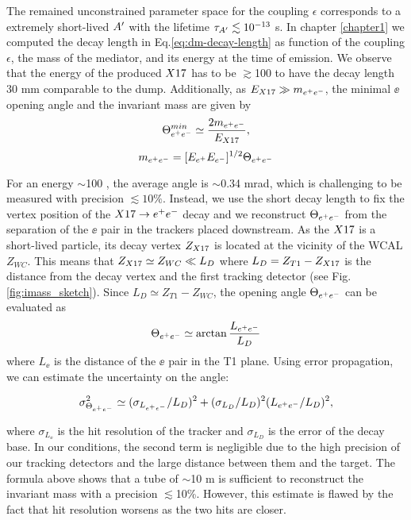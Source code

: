 The remained unconstrained parameter space for the coupling $\epsilon$  corresponds to a extremely short-lived $A'$ with the lifetime $\tau_{A'} \lesssim 10^{-13}$ s. In chapter \ref{chapter1} we computed the decay length in Eq.\ref{eq:dm-decay-length} as function of the coupling $\epsilon$, the mass of the mediator, and its energy at the time of emission.
We observe that the energy of the produced $X17$ has to be $\gtrsim$100 \gev to have the decay length 30 mm comparable to the dump.
Additionally, as $E_{X17} \gg m_{e^+e^-}$, the minimal $\ee$ opening angle and the invariant mass are given by
\begin{equation} 
\Theta_{ e^+e^-}^{min} \simeq  \frac{2m_{e^+e^-}}{E_{X17}},
\label{eqn:angle}
\end{equation}
\begin{equation}
m_{e^+e^-} = [E_{e^+} E_{e^-}]^{1/2} \Theta_{ e^+e^-}
\label{eqn:imass}
\end{equation}

For an energy $\sim$100 \gev, the average angle is $\sim$0.34 mrad, which is challenging to be measured with precision $\lesssim 10\%$. Instead, we use the short decay length to fix the vertex position of the $X17 \rightarrow e^+ e^-$ decay and we reconstruct $\Theta_{ e^+e^-}$ from the separation of the $\ee$ pair in the trackers placed downstream. As the $X17$ is a short-lived particle, its decay vertex $Z_{X17}$ is located at the vicinity of the WCAL $Z_{WC}$. This means that $Z_{X17} \simeq Z_{WC} \ll L_D$ where $L_D=Z_{T1}-Z_{X17}$ is the distance from the decay vertex and the first tracking detector (see Fig.\ref{fig:imass_sketch}). Since $L_D \simeq Z_{T1} - Z_{WC}$, the opening angle $\Theta_{ e^+e^-}$ can be evaluated as 
\begin{equation}
\Theta_{ e^+e^-} \simeq \arctan{\frac{ L_{e^+e^-}}{L_D}}
\label{angle-est}
\end{equation}
where $L_{\ee}$ is the distance of the $\ee$ pair in the T1 plane. Using error propagation, we can estimate the uncertainty on the angle:

\begin{equation}
  \sigma^2_{\Theta_{ e^+e^-}} \simeq (\sigma_{L_{e^+e^-}}  / L_D)^2 + (\sigma_{L_D} / L_D)^2(L_{e^+e^-} / L_D)^2,
  \label{eqn:thetaerr}
\end{equation}

where $\sigma_{L_{\ee}}$ is the hit resolution of the tracker and $\sigma_{L_D}$ is the error of the decay base. In our conditions, the second term is negligible due to the high precision of our tracking detectors and the large distance between them and the target. The formula above shows that a tube of $\sim$10 m is sufficient to reconstruct the invariant mass with a precision $\lesssim$10\%. However, this estimate is flawed by the fact that hit resolution worsens as the two hits are closer.

